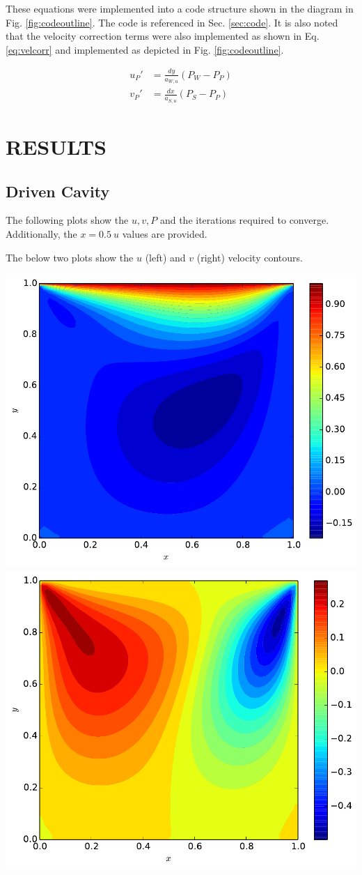 \documentclass[cleanfoot,cleanhead,onecolumn,12pt,notitlepage]{asme2e}
\begin{document}
These equations were implemented into a code structure shown in the diagram in Fig. \ref{fig:codeoutline}.  The code is referenced in Sec. \ref{sec:code}.  It is also noted that the velocity correction terms were also implemented as shown in Eq. \ref{eq:velcorr} and implemented as depicted in Fig. \ref{fig:codeoutline}.  


\begin{equation}
\begin{aligned}
u_P' &= \frac{dy}{a_{W,u}} (P_W - P_P) \\
v_P' &= \frac{dx}{a_{S,u}} (P_S - P_P)
\label{eq:velcorr}
\end{aligned}
\end{equation}


\section{RESULTS}

\subsection{Driven Cavity}

The following plots show the $u,v,P$ and the iterations required to converge.  Additionally, the $x=0.5~u$ values are provided.  

The below two plots show the $u$ (left) and $v$ (right) velocity contours.

\includegraphics[width=0.4\linewidth]{../Cavity/u.pdf}
\includegraphics[width=0.4\linewidth]{../Cavity/v.pdf}
\end{document}
